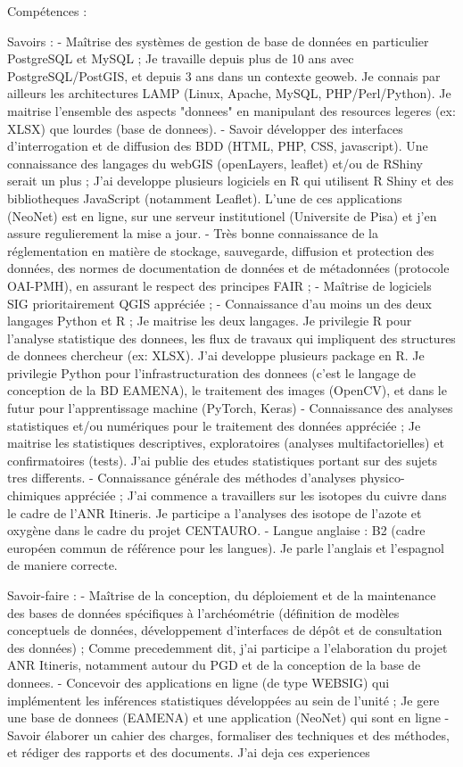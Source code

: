 \documentclass[12pt]{article}
\begin{document}
Compétences :
 
Savoirs :
- Maîtrise des systèmes de gestion de base de données en particulier PostgreSQL et MySQL ;
Je travaille depuis plus de 10 ans avec PostgreSQL/PostGIS, et depuis 3 ans dans un contexte geoweb. Je connais par ailleurs les architectures LAMP (Linux, Apache, MySQL, PHP/Perl/Python). Je maitrise l'ensemble des aspects "donnees" en manipulant des resources legeres (ex: XLSX) que lourdes (base de donnees).
- Savoir développer des interfaces d'interrogation et de diffusion des BDD (HTML, PHP, CSS, javascript). Une connaissance des langages du webGIS (openLayers, leaflet) et/ou de RShiny serait un plus ;
J'ai developpe plusieurs logiciels en R qui utilisent R Shiny et des bibliotheques JavaScript (notamment Leaflet). L'une de ces applications (NeoNet) est en ligne, sur une serveur institutionel (Universite de Pisa) et j'en assure regulierement la mise a jour. 
- Très bonne connaissance de la réglementation en matière de stockage, sauvegarde, diffusion et protection des données, des normes de documentation de données et de métadonnées (protocole OAI-PMH), en assurant le respect des principes FAIR ;
- Maîtrise de logiciels SIG prioritairement QGIS appréciée ;
- Connaissance d'au moins un des deux langages Python et R ;
Je maitrise les deux langages. Je privilegie R pour l'analyse statistique des donnees, les flux de travaux qui impliquent des structures de donnees chercheur (ex: XLSX). J'ai developpe plusieurs package en R. Je privilegie Python pour l'infrastructuration des donnees (c'est le langage de conception de la BD EAMENA), le traitement des images (OpenCV), et dans le futur pour l'apprentissage machine (PyTorch, Keras)
- Connaissance des analyses statistiques et/ou numériques pour le traitement des données appréciée ;
Je maitrise les statistiques descriptives, exploratoires (analyses multifactorielles) et confirmatoires (tests). J'ai publie des etudes statistiques portant sur des sujets tres differents. 
- Connaissance générale des méthodes d'analyses physico-chimiques appréciée ;
J'ai commence a travaillers sur les isotopes du cuivre dans le cadre de l'ANR Itineris. Je participe a l'analyses des isotope de l'azote et oxygène dans le cadre du projet CENTAURO. 
- Langue anglaise : B2 (cadre européen commun de référence pour les langues).
Je parle l'anglais et l'espagnol de maniere correcte.

Savoir-faire :
- Maîtrise de la conception, du déploiement et de la maintenance des bases de données spécifiques à l'archéométrie (définition de modèles conceptuels de données, développement d'interfaces de dépôt et de consultation des données) ;
Comme precedemment dit, j'ai participe a l'elaboration du projet ANR Itineris, notamment autour du PGD et de la conception de la base de donnees.
- Concevoir des applications en ligne (de type WEBSIG) qui implémentent les inférences statistiques développées au sein de l'unité ;
Je gere une base de donnees (EAMENA) et une application (NeoNet) qui sont en ligne
- Savoir élaborer un cahier des charges, formaliser des techniques et des méthodes, et rédiger des rapports et des documents.
J'ai deja ces experiences
\end{document}
